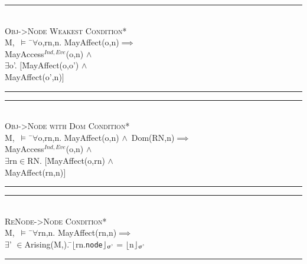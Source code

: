 \documentclass[a4paper,11pt, twoside,twocolumn]{article}
\newenvironment{logic}
{\begin{minipage}[c]{\linewidth}  \small \vspace{0.5em}\begin{tabbing}}
{\end{tabbing}\end{minipage}\vspace{0.5em}}
\newcommand{\loin}{$\in$}
\newcommand{\loforall}{$\forall$}
\newcommand{\loexists}{$\exists$}
\newcommand{\loand}{$\land$}
\newcommand{\loimplies}{$\implies$}
\newcommand{\losigma}{\text{$\upsigma$}}
\newcommand{\loturns} {$\vDash$}
\newcommand{\loexec}[2] {$\lfloor$#1$\rfloor _{\text{#2}}$}
\newcommand{\hr}{\rule{\linewidth}{0.4pt}}
\begin{document}
\newpage
\begin{logic}
\hr\\
\textsc{\normalsize *Obj->Node Weakest Condition*}\\
M,\losigma\ \loturns\ \=\loforall o,rn,n. MayAffect(o,n)\loimplies\\
\> MayAccess$^{Ind,Eve}$(o,n) \loand\\
\> \loexists o'. $[$\=MayAffect(o,o') \loand\\
\> \>MayAffect(o',n)$]$\\
\hr
\end{logic}

\begin{logic}
\hr\\
\textsc{\normalsize *Obj->Node with Dom Condition*}\\
M,\losigma\ \loturns\ \=\loforall o,rn,n. MayAffect(o,n) \loand\ Dom(RN,n)\loimplies\\
\> MayAccess$^{Ind,Eve}$(o,n) \loand\\
\> \loexists rn\loin{RN}. $[$\=MayAffect(o,rn) \loand\\
\> \>MayAffect(rn,n)$]$\\
\hr
\end{logic}

\begin{logic} 
\hr\\
\textsc{\normalsize *ReNode->Node Condition*}\\
M,\losigma\ \loturns\ \=\loforall rn,n. MayAffect(rn,n)\loimplies \\
\>\loexists \losigma' \loin Arising(M,\losigma). \=\loexec{rn.\texttt{node}}{\losigma'} = \loexec{n}{\losigma'}\\
\hr
\end{logic}
\end{document}
